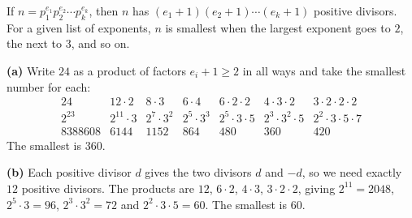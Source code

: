 If $n=p_1^{e_1}p_2^{e_2}\cdots p_k^{e_k}$, then $n$ has $(e_1+1)(e_2+1)\cdots(e_k+1)$ positive divisors. For a given list of exponents, $n$ is smallest when the largest exponent goes to $2$, the next to $3$, and so on.

\textbf{(a)} Write $24$ as a product of factors $e_i+1\ge2$ in all ways and take the smallest number for each:
\[\begin{array}{ccccccc}
24&12\cdot2&8\cdot3&6\cdot4&6\cdot2\cdot2&4\cdot3\cdot2&3\cdot2\cdot2\cdot2\\\hline
2^{23}&2^{11}\cdot3&2^7\cdot3^2&2^5\cdot3^3&2^5\cdot3\cdot5&2^3\cdot3^2\cdot5&2^2\cdot3\cdot5\cdot7\\
8388608&6144&1152&864&480&360&420
\end{array}\]
The smallest is $\boxed{360}$.

\textbf{(b)} Each positive divisor $d$ gives the two divisors $d$ and $-d$, so we need exactly $12$ positive divisors. The products are $12$, $6\cdot2$, $4\cdot3$, $3\cdot2\cdot2$, giving $2^{11}=2048$, $2^5\cdot3=96$, $2^3\cdot3^2=72$ and $2^2\cdot3\cdot5=60$. The smallest is $\boxed{60}$.
